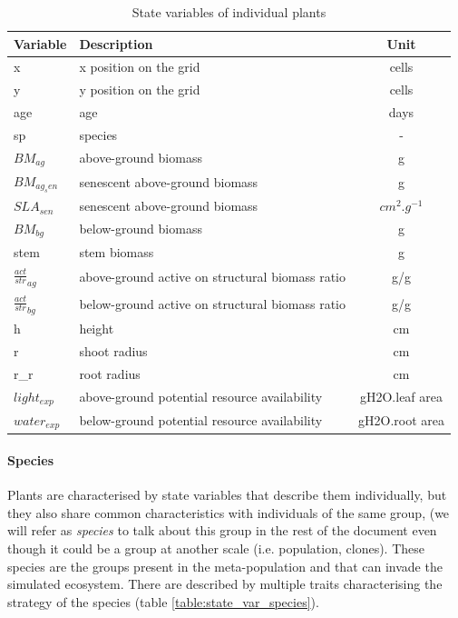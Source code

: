\begin{table}
\caption{State variables of individual plants} 
\label{table:state_var_plant}
\begin{tabular}{l|l|c}
Variable & Description & Unit \\ 
\hline 
x & x position on the grid & cells \\
y & y position on the grid & cells \\
age & age & days \\
sp & species & - \\
$BM_{ag}$ & above-ground biomass & g \\
$BM_{ag_sen}$ & senescent above-ground biomass & g \\
$SLA_{sen}$ & senescent above-ground biomass & $cm^{2}.g^{-1}$ \\
$BM_{bg}$ & below-ground biomass & g \\
stem & stem biomass & g \\
$\frac{act}{str}_{ag}$ & above-ground active on structural biomass ratio & g/g \\
$\frac{act}{str}_{bg}$ & below-ground active on structural biomass ratio & g/g \\
h & height & cm \\
r & shoot radius & cm \\
r\_r & root radius & cm \\ 
$light_{exp}$ & above-ground potential resource availability & gH2O.leaf area\\
$water_{exp}$ & below-ground potential resource availability & gH2O.root area\\
\end{tabular} 
\vspace*{0.5cm}
\end{table}


\paragraph{Species} Plants are characterised by state variables that describe them individually, but they also share common characteristics with individuals of the same group, (we will refer as \textit{species} to talk about this group in the rest of the document even though it could be a group at another scale (i.e. population, clones). These species are the groups present in the meta-population and that can invade the simulated ecosystem. There are described by multiple traits characterising the strategy of the species (table \ref{table:state_var_species}).


